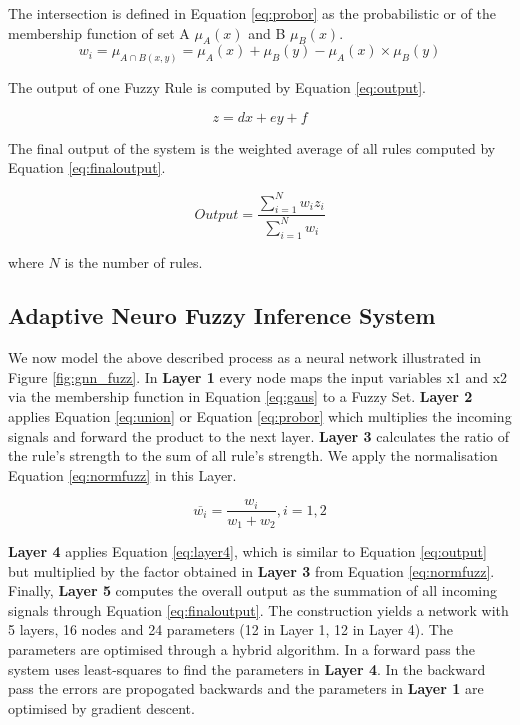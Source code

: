 The intersection is defined in Equation \ref{eq:probor} as the probabilistic or of the membership function of set A $\mu_A(x)$ and B $\mu_B(x).$ 
\begin{equation} \label{eq:probor}
 w_i =  \mu_{A\cap B(x,y)} =   \mu_A (x)  + \mu_B(y) -  \mu_A (x)  \times \mu_B(y)
 \end{equation}

The output of one Fuzzy Rule is computed by Equation \ref{eq:output}. 


\begin{equation} \label{eq:output}
 z = dx + ey + f  \end{equation}

The final output of the system is the weighted average of all rules computed by Equation \ref{eq:finaloutput}.

\begin{equation} \label{eq:finaloutput}
Output = \frac { \sum\limits_{i=1}^N  w_i z_i} {\sum\limits_{i=1}^N  w_i } \end{equation}

where $N$ is the number of rules. 

\subsection{Adaptive Neuro Fuzzy Inference System }

We now model the above described process as a neural network illustrated in Figure \ref{fig:gnn_fuzz}. In \textbf{Layer 1} every node maps the input variables x1 and x2 via the membership function in Equation \ref{eq:gaus} to a Fuzzy Set.  \textbf{Layer 2} applies Equation \ref{eq:union} or Equation \ref{eq:probor} which multiplies the incoming signals and forward the product to the next layer. \textbf {Layer 3} calculates the ratio of the rule's strength to the sum of all rule's strength. We apply the normalisation Equation \ref{eq:normfuzz} in this Layer. 

\begin{equation} \label{eq:normfuzz}
\overline{w_i} =  \frac{w_i}{w_1 + w_2}, i = 1,2 \end{equation}

 \textbf{Layer 4} applies Equation \ref{eq:layer4}, which is similar to Equation \ref{eq:output} but multiplied by the factor obtained in \textbf{Layer 3} from Equation \ref{eq:normfuzz}. Finally, \textbf{Layer 5} computes the overall output as the summation of all incoming signals through Equation \ref{eq:finaloutput}. The construction yields a network with 5 layers,  16 nodes and 24 parameters (12 in Layer 1, 12 in Layer 4). The parameters are optimised through a hybrid algorithm. In a forward pass the system uses least-squares to find the parameters in \textbf{Layer 4}. In the backward pass the errors are propogated backwards and the parameters in \textbf{Layer 1} are optimised by gradient descent.  
 
